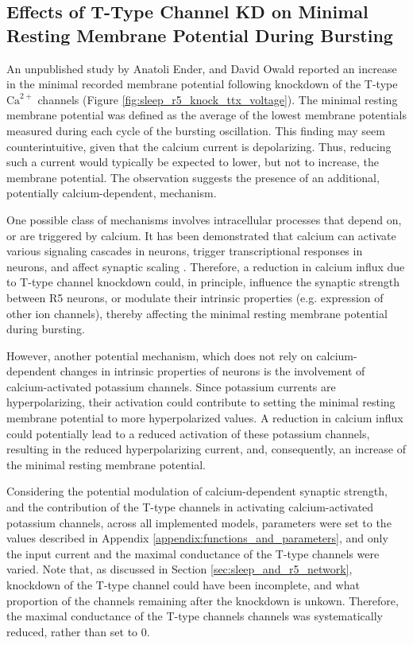 \documentclass[../main.tex]{subfiles}
\begin{document}
\subsection{Effects of T-Type Channel KD on Minimal Resting Membrane Potential During Bursting}

\noindent An unpublished study by Anatoli Ender, and David Owald reported an increase in the minimal recorded membrane potential following knockdown of the T-type $\text{Ca}^{2+}$ channels (Figure \ref{fig:sleep_r5_knock_ttx_voltage}). The minimal resting membrane potential was defined as the average of the lowest membrane potentials measured during each cycle of the bursting oscillation. This finding may seem counterintuitive, given that the calcium current is depolarizing. Thus, reducing such a current would typically be expected to lower, but not to increase, the membrane potential. The observation suggests the presence of an additional, potentially calcium-dependent, mechanism.

One possible class of mechanisms involves intracellular processes that depend on, or are triggered by calcium.
It has been demonstrated that calcium can activate various signaling cascades in neurons, trigger transcriptional responses in neurons, and affect synaptic scaling \parencite{hagenstonFunctionalConsequencesCalciumDependent2020}. Therefore, a reduction in calcium influx due to T-type channel knockdown could, in principle, influence the synaptic strength between R5 neurons,
or modulate their intrinsic properties (e.g. expression of other ion channels), thereby affecting the minimal resting membrane potential during bursting.

However, another potential mechanism, which does not rely on calcium-dependent changes in intrinsic properties of neurons is the involvement of calcium-activated potassium channels. Since potassium currents are hyperpolarizing, their activation could contribute to setting the minimal resting membrane potential to more hyperpolarized values.
A reduction in calcium influx could potentially lead to a reduced activation of these potassium channels, resulting in the reduced hyperpolarizing current, and, consequently, an increase of the minimal resting membrane potential.

Considering the potential modulation of calcium-dependent synaptic strength, and the contribution of the T-type channels in activating calcium-activated potassium channels, across all implemented models, parameters were set to the values described in Appendix \ref{appendix:functions_and_parameters}, and only the input current and the maximal conductance of the T-type channels were varied. Note that, as discussed in Section \ref{sec:sleep_and_r5_network},
knockdown of the T-type channel could have been incomplete, and what proportion of the channels remaining after the knockdown is unkown. Therefore, the maximal conductance of the T-type channels channels was systematically reduced, rather than set to $0$.
\end{document}
